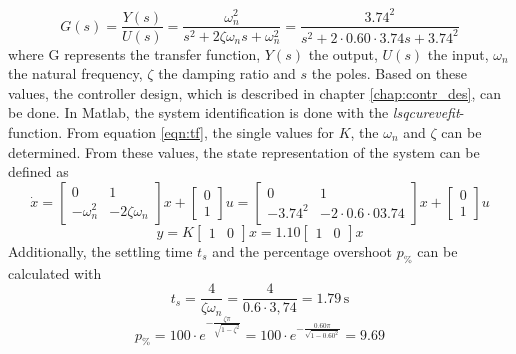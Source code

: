 \begin{equation}
        G(s) =\frac{Y(s)}{U(s)}= \frac{\omega_n^2}{s^2+2 \zeta \omega_n s+\omega_n^2} = \frac{3.74^2}{s^2+2 \cdot 0.60 \cdot3.74 s+3.74^2}
        \label{eqn:tf}
\end{equation}
where G represents the transfer function, $Y(s)$ the output, $U(s)$ the input, $\omega_n$ the natural frequency, $\zeta$ the damping ratio and $s$ the poles. Based on these values, the controller design, which is described in  chapter \ref{chap:contr_des}, can be done. 
In Matlab, the system identification is done with the \textit{lsqcurevefit}-function.
From equation \ref{eqn:tf}, the single values for $K$, the $\omega_n$ and $\zeta$ can be determined. From these values, the state representation of the system can be defined as
\begin{equation}
    \dot{x} = 
    \begin{bmatrix}
        0 & 1 \\
        -\omega_n^2 & -2\zeta\omega_n
    \end{bmatrix}
    x
    +
    \begin{bmatrix}
        0 \\
        1
    \end{bmatrix}
    u = 
     \begin{bmatrix}
        0 & 1 \\
        -3.74^2 & -2\cdot0.6\cdot03.74
    \end{bmatrix}
    x
    +
    \begin{bmatrix}
        0 \\
        1
    \end{bmatrix}
    u
\end{equation}
\begin{equation}
y = K\begin{bmatrix} 1 & 0 \end{bmatrix} x = 1.10\begin{bmatrix} 1 & 0 \end{bmatrix} x
\end{equation}
Additionally, the settling time $t_s$ and the percentage overshoot $p_\%$ can be calculated with 
\begin{equation}
    t_s=\frac{4}{\zeta\omega_n} = \frac{4}{0.6 \cdot 3,74} = 1.79\,\text{s}
\end{equation}
\begin{equation}
    p_\% = 100 \cdot e^{-\frac{\zeta\pi}{\sqrt{1-\zeta^2}}} = 100 \cdot e^{-\frac{0.60\pi}{\sqrt{1-0.60^2}}} = 9.69
\end{equation}

